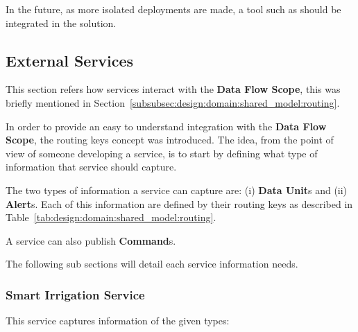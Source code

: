 In the future, as more isolated deployments are made, a tool such as  should be integrated in the solution.

\subsection{External Services}
\label{subsec:implementation:description:services}

This section refers how services interact with the \textbf{Data Flow Scope}, this was briefly mentioned in Section~\ref{subsubsec:design:domain:shared_model:routing}.

In order to provide an easy to understand integration with the \textbf{Data Flow Scope}, the routing keys concept was introduced. The idea, from the point of view of someone developing a service, is to start by defining what type of information that service should capture.

The two types of information a service can capture are: (i) \textbf{Data Unit}s and (ii) \textbf{Alert}s. Each of this information are defined by their routing keys as described in Table~\ref{tab:design:domain:shared_model:routing}.

A service can also publish \textbf{Command}s.

The following sub sections will detail each service information needs.

\subsubsection{Smart Irrigation Service}
\label{subsubsec:implementation:description:services:irrigation}

This service captures information of the given types:

